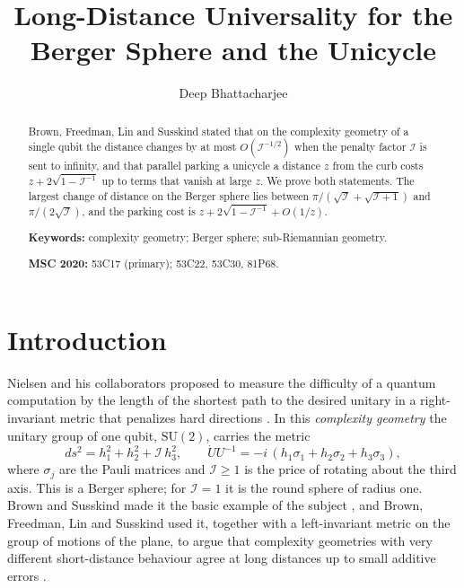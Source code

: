 \documentclass[11pt]{amsart}
\theoremstyle{definition}
\newcommand{\I}{\mathcal{I}}
\newcommand{\SU}{\mathrm{SU}(2)}
\begin{document}
\title[Universality for the Berger sphere and the unicycle]{Long-Distance Universality for the\\ Berger Sphere and the Unicycle}

\author{Deep Bhattacharjee}
\address{Formerly, Electro-Gravitational Space Propulsion Laboratory (EGSPL), Bhubaneswar, Odisha 751030, India}
\address{Formerly, University of Calcutta (Heramba Chandra College), 23/49 Gariahat Road, Golpark, Kolkata 700029, West Bengal, India}

\begin{abstract}
Brown, Freedman, Lin and Susskind stated that on the complexity geometry of a single qubit the distance changes by at most $O(\I^{-1/2})$ when the penalty factor $\I$ is sent to infinity, and that parallel parking a unicycle a distance $z$ from the curb costs $z+2\sqrt{1-\I^{-1}}$ up to terms that vanish at large $z$. We prove both statements. The largest change of distance on the Berger sphere lies between $\pi/(\sqrt{\I}+\sqrt{\I+1})$ and $\pi/(2\sqrt{\I})$, and the parking cost is $z+2\sqrt{1-\I^{-1}}+O(1/z)$.

\medskip\noindent\textbf{Keywords:} complexity geometry; Berger sphere; sub-Riemannian geometry.

\smallskip\noindent\textbf{MSC 2020:} 53C17 (primary); 53C22, 53C30, 81P68.
\end{abstract}

\maketitle

\section{Introduction}\label{sec:intro}

Nielsen and his collaborators proposed to measure the difficulty of a quantum computation by the length of the shortest path to the desired unitary in a right-invariant metric that penalizes hard directions \cite{NDGD06}. In this \emph{complexity geometry} the unitary group of one qubit, $\SU$, carries the metric
\begin{equation}\label{eq:metric}
ds^2=h_1^2+h_2^2+\I\,h_3^2,\qquad \dot U U^{-1}=-i\,(h_1\sigma_1+h_2\sigma_2+h_3\sigma_3),
\end{equation}
where $\sigma_j$ are the Pauli matrices and $\I\ge1$ is the price of rotating about the third axis. This is a Berger sphere; for $\I=1$ it is the round sphere of radius one. Brown and Susskind made it the basic example of the subject \cite{BS19}, and Brown, Freedman, Lin and Susskind used it, together with a left-invariant metric on the group of motions of the plane, to argue that complexity geometries with very different short-distance behaviour agree at long distances up to small additive errors \cite{BFLS23}.
\end{document}
